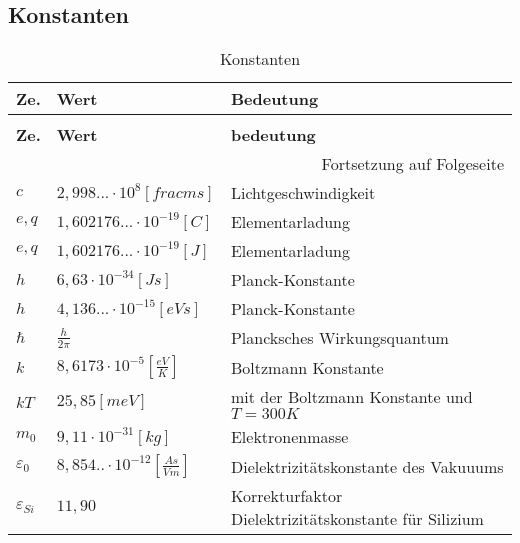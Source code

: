 \documentclass[12pt,a4paper]{article}%
\numberwithin{equation}{section}
\def\bracks#1{\left[ #1 \right]}
\numberwithin{equation}{subsection}
\begin{document}
	\subsection{Konstanten} \label{ch:constants}
	\renewcommand{\arraystretch}{1.5}
	
	\begin{longtable} {|p{0.6cm}|p{4.4cm}|p{8.4cm}|} \hline
	\textbf{Ze.} & \textbf{Wert} & \textbf{Bedeutung}\\
	\hline
	\endfirsthead %
	\caption{Konstanten}\\ \hline
	\textbf{Ze.} & \textbf{Wert} & \textbf{bedeutung}\\
	\hline
	\endhead %
	\multicolumn{3}{r}{Fortsetzung auf Folgeseite}\\
	\endfoot
	\hline
	\endlastfoot
	
	$c$ & $2,998...\cdot 10^8 \bracks{frac{m}{s}}$ & Lichtgeschwindigkeit\\ \hline
	$e,q$ & $1,602176...\cdot 10^{-19}\bracks{C}$ & Elementarladung\\ \hline
	$e,q$ & $1,602176...\cdot 10^{-19}\bracks{J}$ & Elementarladung\\ \hline
	$h$ & $6,63 \cdot 10^{-34} \bracks{Js}$ & Planck-Konstante\\ \hline
	$h$ & $4,136...\cdot 10^{-15} \bracks{eVs}$ & Planck-Konstante\\ \hline
	$\hbar$ & $\frac{h}{2\pi}$ & Plancksches Wirkungsquantum\\ \hline
	$k$ & $8,6173 \cdot 10^{-5} \bracks{\frac{eV}{K}}$ & Boltzmann Konstante\\ \hline
	$kT$ & $25,85 \bracks{meV}$ & mit der Boltzmann Konstante und $T=300K$ \\ \hline
	$m_0$ & $9,11 \cdot 10^{-31} \bracks{kg}$ & Elektronenmasse\\ \hline
	 
	
	$\varepsilon_0$ & $8,854..\cdot 10^{-12}\bracks{\frac{As}{Vm}}$ & Dielektrizitätskonstante des Vakuuums \\ \hline
	$\varepsilon_{Si}$ & $11,90$ & Korrekturfaktor Dielektrizitätskonstante für Silizium\\ \hline
	\end{longtable}
	\renewcommand{\arraystretch}{1}
  
\end{document}

